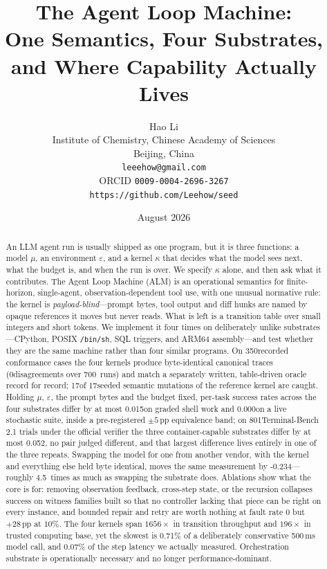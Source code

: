 \documentclass[11pt,a4paper]{article}
\title{The Agent Loop Machine:\\
       One Semantics, Four Substrates,\\
       and Where Capability Actually Lives}
\author{
  Hao Li\\
  Institute of Chemistry, Chinese Academy of Sciences\\
  Beijing, China\\
  \texttt{leeehow@gmail.com}\\
  ORCID \texttt{0009-0004-2696-3267}\\
  \texttt{https://github.com/Leehow/seed}
}
\date{August 2026}
\begin{document}
\maketitle

\begin{abstract}
An LLM agent run is usually shipped as one program, but it is three functions:
a model $\mu$, an environment $\varepsilon$, and a kernel $\kappa$ that decides
what the model sees next, what the budget is, and when the run is over.
We specify $\kappa$ alone, and then ask what it contributes.
The Agent Loop Machine (ALM) is an operational semantics for finite-horizon,
single-agent, observation-dependent tool use, with one unusual normative rule:
the kernel is \emph{payload-blind}---prompt bytes, tool output and diff hunks
are named by opaque references it moves but never reads.
What is left is a transition table over small integers and short tokens.
We implement it four times on deliberately unlike substrates---CPython, POSIX
\texttt{/bin/sh}, SQL triggers, and ARM64 assembly---and test whether they are
the same machine rather than four similar programs.
On 350recorded conformance cases the four kernels produce
byte-identical canonical traces (0disagreements over 700\
runs) and match a separately written, table-driven oracle record for record;
17of 17seeded semantic mutations of the reference kernel
are caught.
Holding $\mu$, $\varepsilon$, the prompt bytes and the budget fixed, per-task
success rates across the four substrates differ by at most 0.015on
graded shell work and 0.000on a live stochastic suite, inside a
pre-registered $\pm5$\,pp equivalence band; on 801Terminal-Bench 2.1
trials under the official verifier the three container-capable substrates
differ by at most 0.052, no pair judged different, and that largest
difference lives entirely in one of the three repeats. Swapping the model
for one from another vendor, with the kernel and everything else held byte
identical, moves the same measurement by -0.234---roughly 4.5\
times as much as swapping the substrate does.
Ablations show what the core is for: removing observation feedback,
cross-step state, or the recursion collapses success on witness families built
so that no controller lacking that piece can be right on every instance, and
bounded repair and retry are worth nothing at fault rate $0$ but
$+28$\,pp at $10\%$.
The four kernels span $1656\times$ in transition throughput and
$196\times$ in trusted computing base, yet the slowest is
0.71\% of a deliberately conservative 500\,ms model call, and
0.07\% of the step latency we actually measured.
Orchestration substrate is operationally necessary and no longer
performance-dominant.
\end{abstract}
\end{document}
